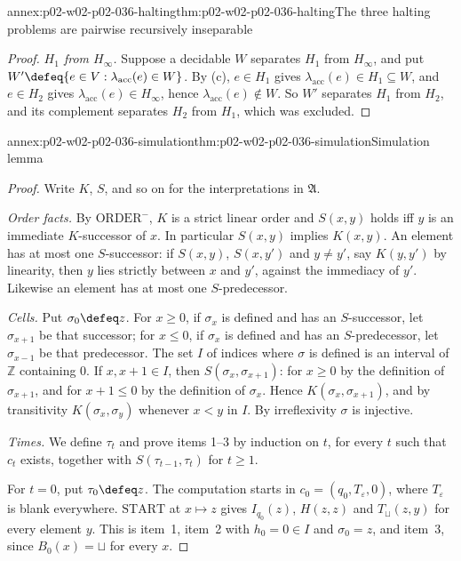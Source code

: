 \begin{annexitem}{annex:p02-w02-p02-036-halting}{thm:p02-w02-p02-036-halting}{The three halting problems are pairwise recursively inseparable}
\begin{proof}
\emph{\(H_1\) from \(H_\infty\).}  Suppose a decidable \(W\) separates \(H_1\)
from \(H_\infty\), and put \(W'\defeq\{e\in V:\lambda_{\mathrm{acc}}(e)\in W\}\).
By (c), \(e\in H_1\) gives \(\lambda_{\mathrm{acc}}(e)\in H_1\subseteq W\), and
\(e\in H_2\) gives \(\lambda_{\mathrm{acc}}(e)\in H_\infty\), hence
\(\lambda_{\mathrm{acc}}(e)\notin W\).  So \(W'\) separates \(H_1\) from \(H_2\),
and its complement separates \(H_2\) from \(H_1\), which was excluded.
\end{proof}
\end{annexitem}

\begin{annexitem}{annex:p02-w02-p02-036-simulation}{thm:p02-w02-p02-036-simulation}{Simulation lemma}
\begin{proof}
Write \(K\), \(S\), and so on for the interpretations in \(\mathfrak A\).

\emph{Order facts.}  By \(\mathrm{ORDER}^{-}\), \(K\) is a strict linear order
and \(S(x,y)\) holds iff \(y\) is an immediate \(K\)-successor of \(x\).  In
particular \(S(x,y)\) implies \(K(x,y)\).  An element has at most one
\(S\)-successor: if \(S(x,y)\), \(S(x,y')\) and \(y\neq y'\), say \(K(y,y')\) by
linearity, then \(y\) lies strictly between \(x\) and \(y'\), against the
immediacy of \(y'\).  Likewise an element has at most one
\(S\)-predecessor.

\emph{Cells.}  Put \(\sigma_0\defeq z\).  For \(x\geq0\), if \(\sigma_x\) is
defined and has an \(S\)-successor, let \(\sigma_{x+1}\) be that successor; for
\(x\leq0\), if \(\sigma_x\) is defined and has an \(S\)-predecessor, let
\(\sigma_{x-1}\) be that predecessor.  The set \(I\) of indices where
\(\sigma\) is defined is an interval of \(\mathbb Z\) containing \(0\).  If
\(x,x+1\in I\), then \(S(\sigma_x,\sigma_{x+1})\): for \(x\geq0\) by the
definition of \(\sigma_{x+1}\), and for \(x+1\leq0\) by the definition of
\(\sigma_x\).  Hence \(K(\sigma_x,\sigma_{x+1})\), and by transitivity
\(K(\sigma_x,\sigma_y)\) whenever \(x<y\) in \(I\).  By irreflexivity \(\sigma\)
is injective.

\emph{Times.}  We define \(\tau_t\) and prove items 1--3 by induction on \(t\),
for every \(t\) such that \(c_t\) exists, together with
\(S(\tau_{t-1},\tau_t)\) for \(t\geq1\).

For \(t=0\), put \(\tau_0\defeq z\).  The computation starts in
\(c_0=(q_0,T_{\varepsilon},0)\), where \(T_{\varepsilon}\) is blank everywhere.
\(\mathrm{START}\) at \(x\mapsto z\) gives \(I_{q_0}(z)\), \(H(z,z)\) and
\(T_{\sqcup}(z,y)\) for every element \(y\).  This is item~1, item~2 with
\(h_0=0\in I\) and \(\sigma_0=z\), and item~3, since \(B_0(x)=\sqcup\) for every
\(x\).


\end{proof}
\end{annexitem}
